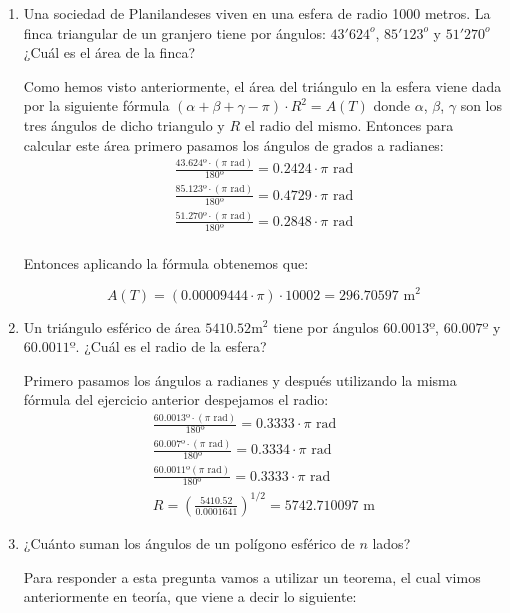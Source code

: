 \begin{enumerate}
\item Una sociedad de Planilandeses viven en una esfera de radio 1000 metros. La finca triangular de un granjero tiene por ángulos: $43'624^o$, $85'123^o$ y $51'270^o$ ¿Cuál es el área de la finca?


Como hemos visto anteriormente, el área del triángulo en la esfera viene dada por la siguiente fórmula $(\alpha + \beta + \gamma - \pi) \cdot R^2 = A(T)$ donde $\alpha$, $\beta$, $\gamma$ son los tres ángulos de dicho triangulo y $R$ el radio del mismo. Entonces para calcular este área primero pasamos los ángulos de grados a radianes:
\begin{align*}
\frac{43.624º \cdot (\pi \text{ rad} )}{180º} = 0.2424 \cdot \pi \text{ rad} \\
\frac{85.123º \cdot (\pi \text{ rad})}{180º} = 0.4729 \cdot \pi \text{ rad} \\
\frac{51.270º \cdot (\pi \text{ rad})}{180º} = 0.2848 \cdot \pi \text{ rad} \\
\end{align*}

Entonces aplicando la fórmula obtenemos que:

\[A(T) = (0.00009444 \cdot \pi) \cdot 10002 = 296.70597  \text{ m}^2\]

\item Un triángulo esférico de área $5410.52 \text{m}^2$
tiene por ángulos $60.0013º$, $60.007º$ y $60.0011º$. ¿Cuál es el radio de la esfera?

Primero pasamos los ángulos a radianes y después utilizando la misma fórmula del ejercicio anterior despejamos el radio:
\begin{align*}
\frac{60.0013º \cdot (\pi \text{ rad})}{180º} = 0.3333 \cdot \pi \text{ rad} \\
\frac{60.007º \cdot (\pi \text{ rad})}{180º} = 0.3334 \cdot \pi \text{ rad} \\
\frac{60.0011º (\pi \text{ rad})}{180º} = 0.3333 \cdot \pi \text{ rad} \\
R = (\frac{5410.52}{0.0001641})^{1/2} = 5742.710097 \text{ m}
\end{align*}


\item ¿Cuánto suman los ángulos de un polígono esférico de $n$ lados?

Para responder a esta pregunta vamos a utilizar un teorema, el cual vimos anteriormente en teoría, que viene a decir lo siguiente: 


\end{enumerate}
